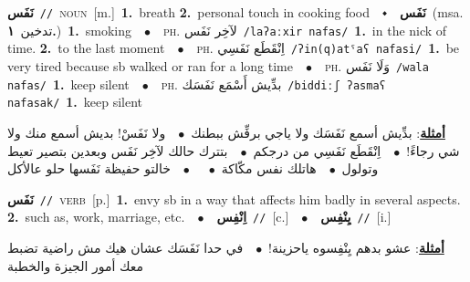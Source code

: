 \documentclass[10pt,a4paper,twoside]{article} %
\begin{document}
\begin{multicols}{2}
{\setlength\topsep{0pt}\textbf{\foreignlanguage{arabic}{نَفَس}}\ {\color{gray}\texttt{//}\color{black}}\ \textsc{noun}\ [m.]\ \textbf{1.}~breath  \textbf{2.}~personal touch in cooking food\ \ $\smblkdiamond$\ \ \setlength\topsep{0pt}\textbf{\foreignlanguage{arabic}{نَفَس}}\ \color{gray}(msa. \foreignlanguage{arabic}{تدخين}~\foreignlanguage{arabic}{\textbf{١.}})\color{black}\ \textbf{1.}~smoking\ \ $\bullet$\ \ \textsc{ph.} \color{gray} \foreignlanguage{arabic}{لآخِر نَفَس}\color{black}\ {\color{gray}\texttt{/{\sffamily laʔaːxir nafas}/}\color{black}}\ \textbf{1.}~in the nick of time.  \textbf{2.}~to the last moment\ \ $\bullet$\ \ \textsc{ph.} \color{gray} \foreignlanguage{arabic}{اِنْقَطَع نَفَسِي}\color{black}\ {\color{gray}\texttt{/{\sffamily ʔin(q)atˤaʕ nafasi}/}\color{black}}\ \textbf{1.}~be very tired because sb walked or ran for a long time\ \ $\bullet$\ \ \textsc{ph.} \color{gray} \foreignlanguage{arabic}{وَلَا نَفَس}\color{black}\ {\color{gray}\texttt{/{\sffamily wala nafas}/}\color{black}}\ \textbf{1.}~keep silent\ \ $\bullet$\ \ \textsc{ph.} \color{gray} \foreignlanguage{arabic}{بدِّيش أَسْمَع  نَفَسَك}\color{black}\ {\color{gray}\texttt{/{\sffamily biddiːʃ ʔasmaʕ nafasak}/}\color{black}}\ \textbf{1.}~keep silent\  \begin{flushright}\color{gray}\foreignlanguage{arabic}{\textbf{\underline{\foreignlanguage{arabic}{أمثلة}}}: بدِّيش أسمع  نَفَسَك ولا ياجي برفِّش ببطنك\ $\bullet$\ \  ولا نَفَسْ! بديش أسمع منك ولا شي رجاءََ!\ $\bullet$\ \  اِنْقَطَع نَفَسِي من درجكم\ $\bullet$\ \  بتترك حالك لآخِر نَفَس وبعدين بتصير تعيط وتولول\ $\bullet$\ \  هاتلك نفس مكّاكة\ $\bullet$\ \  \ $\bullet$\ \  خالتو حفيظة نَفَسها حلو عالأكل}\end{flushright}\color{black}} \vspace{2mm}

{\setlength\topsep{0pt}\textbf{\foreignlanguage{arabic}{نَفَس}}\ {\color{gray}\texttt{//}\color{black}}\ \textsc{verb}\ [p.]\ \textbf{1.}~envy sb in a way that affects him badly in several aspects.  \textbf{2.}~such as, work, marriage, etc.\ \ $\bullet$\ \ \setlength\topsep{0pt}\textbf{\foreignlanguage{arabic}{اِنْفِس}}\ {\color{gray}\texttt{//}\color{black}}\ [c.]\ \ $\bullet$\ \ \setlength\topsep{0pt}\textbf{\foreignlanguage{arabic}{يِنْفِس}}\ {\color{gray}\texttt{//}\color{black}}\ [i.]\  \begin{flushright}\color{gray}\foreignlanguage{arabic}{\textbf{\underline{\foreignlanguage{arabic}{أمثلة}}}: عشو بدهم يِنْفِسوه ياحزينة!\ $\bullet$\ \  في حدا نَفَسَك عشان هيك مش راضية تضبط معك أمور الجيزة والخطبة}\end{flushright}\color{black}} \vspace{2mm}


\end{multicols}
\end{document}
